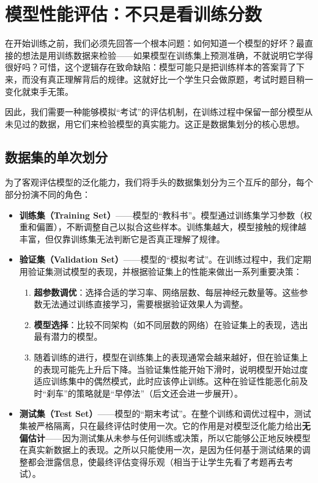 \documentclass[lang=cn,zihao=-4,a4paper,fontset=windows]{beautybook}
\begin{document}
\section{模型性能评估：不只是看训练分数}

在开始训练之前，我们必须先回答一个根本问题：如何知道一个模型的好坏？最直接的想法是用训练数据来检验——如果模型在训练集上预测准确，不就说明它学得很好吗？可惜，这个逻辑存在致命缺陷：模型可能只是把训练样本的答案背了下来，而没有真正理解背后的规律。这就好比一个学生只会做原题，考试时题目稍一变化就束手无策。

因此，我们需要一种能够模拟“考试”的评估机制，在训练过程中保留一部分模型从未见过的数据，用它们来检验模型的真实能力。这正是数据集划分的核心思想。

\subsection{数据集的单次划分}

为了客观评估模型的泛化能力，我们将手头的数据集划分为三个互斥的部分，每个部分扮演不同的角色：

\begin{itemize}
\item \textbf{训练集（Training Set）}——模型的“教科书”。模型通过训练集学习参数（权重和偏置），不断调整自己以拟合这些样本。训练集越大，模型接触的规律越丰富，但仅靠训练集无法判断它是否真正理解了规律。
\item \textbf{验证集（Validation Set）}——模型的“模拟考试”。在训练过程中，我们定期用验证集测试模型的表现，并根据验证集上的性能来做出一系列重要决策：
\begin{enumerate}
\item \textbf{超参数调优}：选择合适的学习率、网络层数、每层神经元数量等。这些参数无法通过训练直接学习，需要根据验证效果人为调整。
\item \textbf{模型选择}：比较不同架构（如不同层数的网络）在验证集上的表现，选出最有潜力的模型。
\item 随着训练的进行，模型在训练集上的表现通常会越来越好，但在验证集上的表现可能先上升后下降。当验证集性能开始下滑时，说明模型开始过度适应训练集中的偶然模式，此时应该停止训练。这种在验证性能恶化前及时“刹车”的策略就是“早停法”（后文还会进一步展开）。
\end{enumerate}
\item \textbf{测试集（Test Set）}——模型的“期末考试”。在整个训练和调优过程中，测试集被严格隔离，只在最终评估时使用一次。它的作用是对模型泛化能力给出\textbf{无偏估计}——因为测试集从未参与任何训练或决策，所以它能够公正地反映模型在真实新数据上的表现。之所以只能使用一次，是因为任何基于测试结果的调整都会泄露信息，使最终评估变得乐观（相当于让学生先看了考题再去考试）。
\end{itemize}
\end{document}
